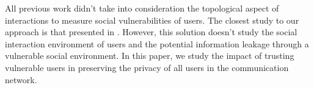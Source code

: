 All previous work didn't take into consideration the topological aspect of interactions to measure social vulnerabilities of users.
The closest study to our approach is that presented in \cite{zeng_trustaware_2014}.
However,
	this solution doesn't study the social interaction environment of users and the potential information leakage through a vulnerable social environment.
In this paper,
	we study the impact of trusting vulnerable users in preserving the privacy of all users in the communication network.


